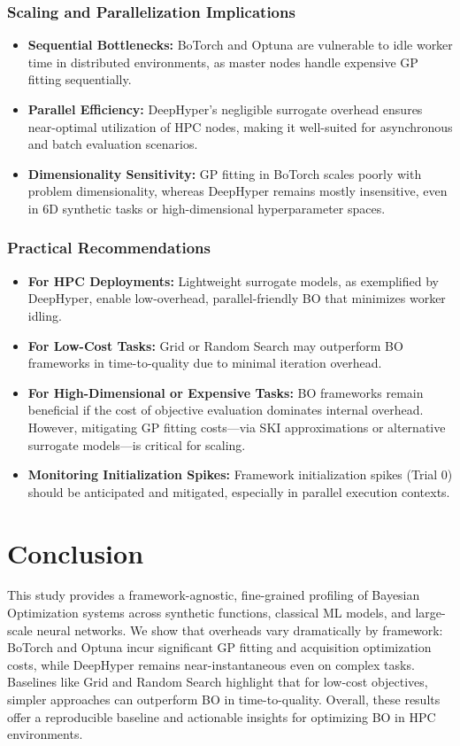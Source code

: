 \documentclass[11pt]{article}
\begin{document}
\subsubsection{Scaling and Parallelization Implications}

\begin{itemize}
    \item \textbf{Sequential Bottlenecks:} BoTorch and Optuna are vulnerable to idle worker time in distributed environments, as master nodes handle expensive GP fitting sequentially.
    \item \textbf{Parallel Efficiency:} DeepHyper’s negligible surrogate overhead ensures near-optimal utilization of HPC nodes, making it well-suited for asynchronous and batch evaluation scenarios.
    \item \textbf{Dimensionality Sensitivity:} GP fitting in BoTorch scales poorly with problem dimensionality, whereas DeepHyper remains mostly insensitive, even in 6D synthetic tasks or high-dimensional hyperparameter spaces.
\end{itemize}

\subsubsection{ Practical Recommendations}

\begin{itemize}
    \item \textbf{For HPC Deployments:} Lightweight surrogate models, as exemplified by DeepHyper, enable low-overhead, parallel-friendly BO that minimizes worker idling.
    \item \textbf{For Low-Cost Tasks:} Grid or Random Search may outperform BO frameworks in time-to-quality due to minimal iteration overhead.
    \item \textbf{For High-Dimensional or Expensive Tasks:} BO frameworks remain beneficial if the cost of objective evaluation dominates internal overhead. However, mitigating GP fitting costs—via SKI approximations or alternative surrogate models—is critical for scaling.
    \item \textbf{Monitoring Initialization Spikes:} Framework initialization spikes (Trial 0) should be anticipated and mitigated, especially in parallel execution contexts.
\end{itemize}


\section{Conclusion}
This study provides a framework-agnostic, fine-grained profiling of Bayesian Optimization systems across synthetic functions, classical ML models, and large-scale neural networks. We show that overheads vary dramatically by framework: BoTorch and Optuna incur significant GP fitting and acquisition optimization costs, while DeepHyper remains near-instantaneous even on complex tasks. Baselines like Grid and Random Search highlight that for low-cost objectives, simpler approaches can outperform BO in time-to-quality. Overall, these results offer a reproducible baseline and actionable insights for optimizing BO in HPC environments.
\end{document}
